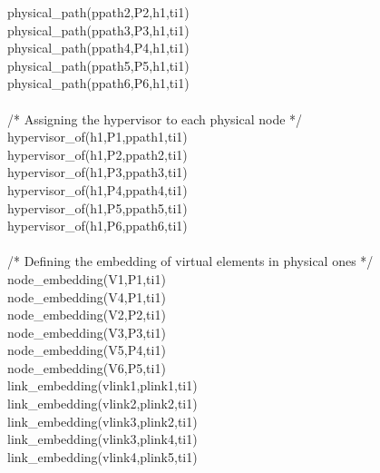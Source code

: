 \begin{myformula}
physical\_path(ppath2,P2,h1,ti1)\\
physical\_path(ppath3,P3,h1,ti1)\\
physical\_path(ppath4,P4,h1,ti1)\\
physical\_path(ppath5,P5,h1,ti1)\\
physical\_path(ppath6,P6,h1,ti1)\\
\textbf{\\}
/* Assigning the hypervisor to each physical node */\\
hypervisor\_of(h1,P1,ppath1,ti1)\\
hypervisor\_of(h1,P2,ppath2,ti1)\\
hypervisor\_of(h1,P3,ppath3,ti1)\\
hypervisor\_of(h1,P4,ppath4,ti1)\\
hypervisor\_of(h1,P5,ppath5,ti1)\\
hypervisor\_of(h1,P6,ppath6,ti1)\\
\textbf{\\}
/* Defining the embedding of virtual elements in physical ones */\\
node\_embedding(V1,P1,ti1)\\
node\_embedding(V4,P1,ti1)\\
node\_embedding(V2,P2,ti1)\\
node\_embedding(V3,P3,ti1)\\
node\_embedding(V5,P4,ti1)\\
node\_embedding(V6,P5,ti1)\\
link\_embedding(vlink1,plink1,ti1)\\
link\_embedding(vlink2,plink2,ti1)\\
link\_embedding(vlink3,plink2,ti1)\\
link\_embedding(vlink3,plink4,ti1)\\
link\_embedding(vlink4,plink5,ti1)
\end{myformula}
